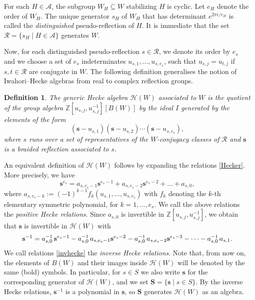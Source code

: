 \documentclass[11pt, reqno]{amsart}
\newcommand{\cA}{\mathcal{A}}
\newcommand{\cH}{\mathcal{H}}
\newcommand{\cR}{\mathcal{R}}
\numberwithin{equation}{section}
\newtheorem{definition}[theorem]{Definition}
\theoremstyle{remark}
\begin{document}
	
	
	
	
	
	
	
	
	For each $H\in \cA$, the subgroup $W_H\subseteq W$ stabilizing $H$ is cyclic. Let $e_H$ denote the order of $W_H$. The unique generator  $s_H$  of $W_H$ that has determinant $e^{2\pi i/e_H}$ is called the {\em distinguished} pseudo-reflection of $H$.  It is immediate that the set $\cR=\{s_H \mid H\in \cA\}$ generates $W$.
	
	Now, for each distinguished pseudo-reflection $s\in \mathcal{R}$, we denote its order by $e_s$ and  we choose a
	set of $e_s$ indeterminates $u_{s,1},\dots, u_{s,e_s}$, such that
	$u_{s,j}=u_{t,j}$ if $s, t \in \mathcal{R}$ are conjugate in $W$. 
	The following definition \cite{BMR} generalises the notion of Iwahori--Hecke algebras from real to complex reflection groups.
	
	\begin{definition}{\rm
			The \emph{generic Hecke algebra} $\cH(W)$ associated to $W$ is the
			quotient of the group algebra $\mathbb{Z}[u_{s,j},u_{s,j}^{-1}][B(W)]$  by the ideal $I$
			generated by the elements of the form
			\begin{equation}
				(\mathbf{s}-u_{s,1})(\mathbf{s}-u_{s,2})\cdots (\mathbf{s}-u_{s,e_s}),
				\label{Hecker}
			\end{equation}
			where $s$ runs over a set of representatives of the $W$-conjugacy classes of $\mathcal{R}$ 
			and $\mathbf{s}$ is a braided reflection associated to $s$.}
	\end{definition}
	
	
	
	An equivalent definition of $\cH(W)$ follows by expanding the relations \eqref{Hecker}.
	More precisely, we have
	\begin{equation}
		{\mathbf{s} }^{e_{s}}=a_{{s},e_{s}-1}{\mathbf{s}}^{e_{s}-1}+a_{{s},e_{s}-2}{\mathbf{s}}^{e_{s}-2}+\dots+a_{{s},0},
		\label{Hecker2}
	\end{equation}
	where $a_{{s},e_{s}-k}:=(-1)^{k-1}f_k({u}_{{s},1},\dots,{u}_{{s},e_{s}})$ with $f_k$ denoting the $k$-th elementary symmetric polynomial, for $k=1,\ldots,e_{s}$. We call the above relations the \emph{positive Hecke relations}. 
	Since $a_{s,0}$ is invertible in $\mathbb{Z}[u_{s,j},u_{s,j}^{-1}]$, we obtain that ${\mathbf{s}}$ is invertible in $\cH(W)$ with
	\begin{equation}\label{invhecke}
		\mathbf{s}^{-1}=a_{s,0}^{-1}\,\mathbf{s}^{e_{s}-1}-a_{s,0}^{-1}\,a_{{s},e_{s}-1}\mathbf{s}^{e_{s}-2}-a_{s,0}^{-1}\,a_{{s},e_{s}-2}{\bf s}^{e_{s}-3}-\dots- a_{s,0}^{-1}\,a_{{s},1}.
	\end{equation}
	We call  relations \eqref{invhecke} the \emph{inverse Hecke relations}.
	Note that, from now on, the elements of $B(W)$ and their images inside $\cH(W)$
	will be denoted by the same (bold) symbols.  In particular, for $s\in S$ we also
	write $\mathbf s$ for the corresponding generator of $\cH(W)$, and we set
	$\mathbf S=\{\mathbf s\mid s\in S\}$. By the inverse Hecke relations,
	$\mathbf s^{-1}$ is a polynomial in $\mathbf s$, so $\mathbf S$ generates
	$\cH(W)$ as an  algebra.
	
\end{document}
